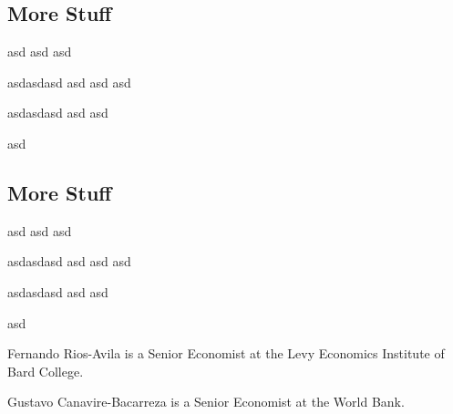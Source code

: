 \documentclass[bib]{statapress}
\begin{document}
\subsection{More Stuff}\label{more-stuff-5}

asd asd asd

asdasdasd asd asd asd

asdasdasd asd asd

asd

\subsection{More Stuff}\label{more-stuff-6}

asd asd asd

asdasdasd asd asd asd

asdasdasd asd asd

asd

\clearpage





\begin{aboutauthors}

Fernando Rios-Avila is a Senior Economist at the Levy Economics
Institute of Bard College.

Gustavo Canavire-Bacarreza is a Senior Economist at the World Bank.

\end{aboutauthors}
\end{document}

